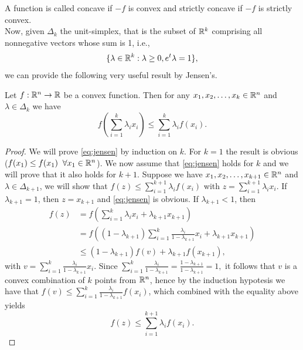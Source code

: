 \documentclass[10pt,a4paper]{article}
\begin{document}
\noindent A function is called concave if $-f$ is convex and strictly concave if $-f$ is strictly convex.\\
Now, given $\Delta_k$ the unit-simplex, that is the
subset of $\mathbb{R}^k$ comprising all nonnegative vectors whose sum is 1, i.e., 
\begin{equation*}
	\{\lambda \in \mathbb{R}^k: \lambda\geq 0, e^t\lambda=1\},
\end{equation*}
we can provide the following very useful result by Jensen's.
\begin{theorem}
	Let $f:\mathbb{R}^n\to \mathbb{R}$ be a convex function. Then for any $x_1, x_2, \dots, x_k \in \mathbb{R}^n$ and $\lambda\in \Delta_k$ we have
	\begin{equation}\label{eq:jensen}
		f\left(\sum_{i=1}^{k}\lambda_ix_i\right) \leq \sum_{i=1}^{k} \lambda_if(x_i).
	\end{equation}
\end{theorem}
\begin{proof}
	We will prove \eqref{eq:jensen} by induction on $k$. For $k=1$ the result is obvious ($f(x_1)\leq f(x_1)\;\;\forall x_1 \in \mathbb{R}^n$). We now assume that \eqref{eq:jensen} holds for $k$ and we will prove that it also holds for $k+1$. Suppose we have $x_1, x_2, \dots, x_{k+1} \in \mathbb{R}^n$ and $\lambda\in \Delta_{k+1}$, we will show that $f(z)\leq \sum_{i=1}^{k+1} \lambda_i f(x_i)$ with $z=\sum_{i=1}^{k+1} \lambda_i x_i$. If $\lambda_{k+1} =1$, then $z=x_{k+1}$ and \eqref{eq:jensen} is obvious. If $\lambda_{k+1}<1$, then
	\begin{equation*}
		\begin{split}
			f(z)& = f\left(\sum_{i=1}^k \lambda_i x_i + \lambda_{k+1}x_{k+1} \right)\\
			&= f\left((1-\lambda_{k+1})\sum_{i=1}^k \frac{\lambda_i}{1-\lambda_{k+1}} x_i + \lambda_{k+1}x_{k+1} \right)\\
			&\leq (1-\lambda_{k+1})f(v) + \lambda_{k+1} f(x_{k+1}),
		\end{split}
	\end{equation*}
	with $v= \sum_{i=1}^k\frac{\lambda_i}{1-\lambda_{k+1}} x_i$. Since $\sum_{i=1}^k\frac{\lambda_i}{1-\lambda_{k+1}} = \frac{1-\lambda_{k+1}}{1-\lambda_{k+1}} = 1,$ it follows that $v$ is a convex combination of $k$ points from $\mathbb{R}^n$, hence by the induction hypotesis we have that $f(v)\leq \sum_{i=1}^k\frac{\lambda_i}{1-\lambda_{k+1}} f(x_i)$, which combined with the equality above yields
	\begin{equation*}
		f(z) \leq \sum_{i=1}^{k+1} \lambda_i f(x_i).
	\end{equation*}
\end{proof}
\end{document}
